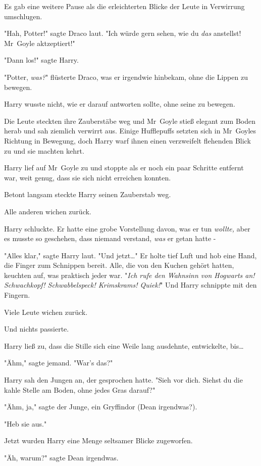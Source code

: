 {Es gab eine weitere Pause als die erleichterten Blicke der Leute in Verwirrung umschlugen.

"Hah, Potter!" sagte Draco laut. "Ich würde gern sehen, wie du \emph{das} anstellst! Mr~Goyle aktzeptiert!"

"Dann los!" sagte Harry.

"Potter, \emph{was?}" flüsterte Draco, was er irgendwie hinbekam, ohne die Lippen zu bewegen.

Harry wusste nicht, wie er darauf antworten sollte, ohne seine zu bewegen.

Die Leute steckten ihre Zauberstäbe weg und Mr~Goyle stieß elegant zum Boden herab und sah ziemlich verwirrt aus. Einige Hufflepuffs setzten sich in Mr~Goyles Richtung in Bewegung, doch Harry warf ihnen einen verzweifelt flehenden Blick zu und sie machten kehrt.

Harry lief auf Mr~Goyle zu und stoppte als er noch ein paar Schritte entfernt war, weit genug, dass sie sich nicht erreichen konnten.

Betont langsam steckte Harry seinen Zauberstab weg.

Alle anderen wichen zurück.

Harry schluckte. Er hatte eine grobe Vorstellung davon, was er tun \emph{wollte,} aber es musste so geschehen, dass niemand verstand, \emph{was} er getan hatte -

"Alles klar," sagte Harry laut. "Und jetzt…" Er holte tief Luft und hob eine Hand, die Finger zum Schnippen bereit. Alle, die von den Kuchen gehört hatten, keuchten auf, was praktisch jeder war. "\emph{Ich rufe den Wahnsinn von Hogwarts an!} \emph{Schwachkopf! Schwabbelspeck! Krimskrams! Quiek!}" Und Harry schnippte mit den Fingern.

Viele Leute wichen zurück.

Und nichts passierte.

Harry ließ zu, dass die Stille sich eine Weile lang ausdehnte, entwickelte, bis…

"Ähm," sagte jemand. "War's das?"

Harry sah den Jungen an, der gesprochen hatte. "Sieh vor dich. Siehst du die kahle Stelle am Boden, ohne jedes Gras darauf?"

"Ähm, ja," sagte der Junge, ein Gryffindor (Dean irgendwas?).

"Heb sie aus."

Jetzt wurden Harry eine Menge seltsamer Blicke zugeworfen.

"Äh, warum?" sagte Dean irgendwas.

}
